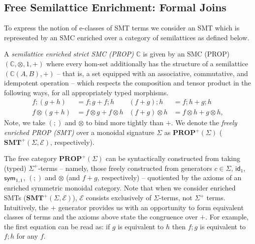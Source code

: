 \documentclass[sigconf, 9pt, nonacm]{acmart}
\begin{document}
\subsection{Free Semilattice Enrichment: Formal Joins}

To express the notion of e-classes of SMT terms we consider an SMT which is represented by an SMC enriched over a category of semilattices as defined below.

\begin{definition}\label{def:enriched-prop}
A \textit{semilattice enriched strict SMC (PROP)}  $\mathbb{C}$ is given by an SMC (PROP) $(\mathbb{C}, \otimes, 1,+)$ where every hom-set additionally has the structure of a semilattice $(\mathbb{C}(A,B), +)$ -- that is,  a set equipped with an associative,  commutative,  and idempotent operation -- which respects the composition and tensor product in the following ways,  for all appropriately typed morphisms. 
\begin{align*}
f ; (g+h) &= f;g + f;h &
(f+g) ; h &= f;h + g;h \\
f \otimes (g+h) &= f \otimes g + f \otimes h & 
(f+g) \otimes h &= f \otimes h + g \otimes h,
\end{align*}
Note,  we take $(;\!)$ and $\otimes$ to bind more tightly than $+$.
We denote the \textit{freely enriched PROP (SMT)} over a monoidal signature $\Sigma$ as $\textbf{PROP}^+(\Sigma)$ ($\textbf{SMT}^+(\Sigma, \mathcal{E})$,  respectively).
\end{definition}

The free category $\textbf{PROP}^+(\Sigma)$ can be syntactically constructed from taking (typed) $\Sigma^+$-terms  -- namely, those freely constructed from generators $c \in \Sigma$, $\textsf{id}_1$, $\textsf{sym}_{1,1}$, $(;\!)$ and $\otimes$ (and $f+g$, respectively) -- quotiented by the axioms of an enriched symmetric monoidal category.
Note that when we consider enriched SMTs ($\textbf{SMT}^{+}(\Sigma,\mathcal{E})$), $\mathcal{E}$ consists exclusively of $\Sigma$-terms, not $\Sigma^{+}$ terms.
Intuitively, the $+$ generator provides us with an opportunity to form equivalent classes of terms and the axioms above state the congruence over $+$.
For example, the first equation can be read as: if $g$ is equivalent to $h$ then $f;g$ is equivalent to $f;h$ for any $f$.
\end{document}
